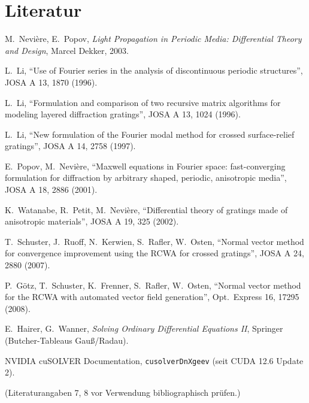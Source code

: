 \section*{Literatur}
\begin{enumerate}[label={[\arabic*]},nosep,leftmargin=2em]
  \item M.~Nevière, E.~Popov, \emph{Light Propagation in Periodic Media: Differential Theory and Design}, Marcel Dekker, 2003.
  \item L.~Li, \enquote{Use of Fourier series in the analysis of discontinuous periodic structures}, JOSA A 13, 1870 (1996).
  \item L.~Li, \enquote{Formulation and comparison of two recursive matrix algorithms for modeling layered diffraction gratings}, JOSA A 13, 1024 (1996).
  \item L.~Li, \enquote{New formulation of the Fourier modal method for crossed surface-relief gratings}, JOSA A 14, 2758 (1997).
  \item E.~Popov, M.~Nevière, \enquote{Maxwell equations in Fourier space: fast-converging formulation for diffraction by arbitrary shaped, periodic, anisotropic media}, JOSA A 18, 2886 (2001).
  \item K.~Watanabe, R.~Petit, M.~Nevière, \enquote{Differential theory of gratings made of anisotropic materials}, JOSA A 19, 325 (2002).
  \item T.~Schuster, J.~Ruoff, N.~Kerwien, S.~Rafler, W.~Osten, \enquote{Normal vector method for convergence improvement using the RCWA for crossed gratings}, JOSA A 24, 2880 (2007).
  \item P.~Götz, T.~Schuster, K.~Frenner, S.~Rafler, W.~Osten, \enquote{Normal vector method for the RCWA with automated vector field generation}, Opt.\ Express 16, 17295 (2008).
  \item E.~Hairer, G.~Wanner, \emph{Solving Ordinary Differential Equations II}, Springer (Butcher-Tableaus Gauß/Radau).
  \item NVIDIA cuSOLVER Documentation, \verb|cusolverDnXgeev| (seit CUDA 12.6 Update 2).
\end{enumerate}
(Literaturangaben 7, 8 vor Verwendung bibliographisch prüfen.)
